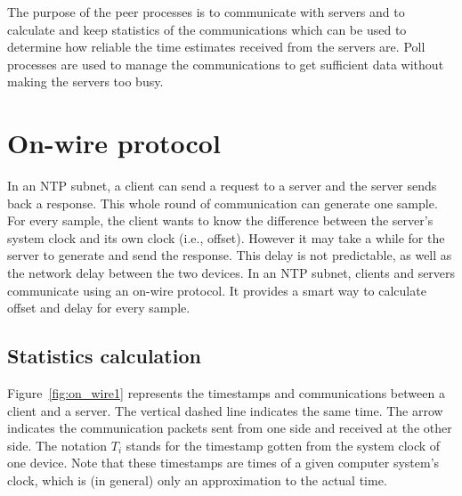 

The purpose of the peer processes is to communicate with servers and to
calculate and keep statistics of the communications which can be used to
determine how reliable the time estimates received from the servers are. Poll
processes are used to manage the communications to get sufficient data without
making the servers too busy.

\section{On-wire protocol}%
\label{sec:on_wire_protocol}
In an NTP subnet, a client can send a request to a server and the server sends
back a response. This whole round of communication can generate one sample. For
every sample, the client wants to know the difference between the server's
system clock and its own clock (i.e., offset).  However it may take a while for
the server to generate and send the response. This delay is not predictable, as
well as the network delay between the two devices. In an NTP subnet, clients
and servers communicate using an on-wire protocol. It provides a smart way to
calculate offset and delay for every sample. 

\subsection{Statistics calculation}%
\label{sub:statistics_calculation}
Figure~\ref{fig:on_wire1} represents the timestamps and communications between
a client and a server. The vertical dashed line indicates the same time. The
arrow indicates the communication packets sent from one side and received at
the other side. The notation $T_i$ stands for the timestamp gotten from the
system clock of one device. Note that these timestamps are times of a given
computer system's clock, which is (in general) only an approximation to the
actual time.



